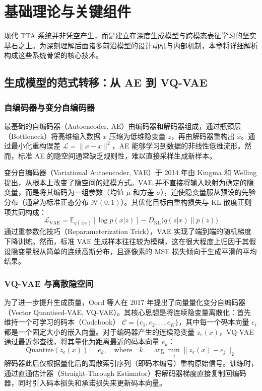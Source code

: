 \documentclass[12pt,a4paper]{article}
\begin{document}
\section{基础理论与关键组件}

现代 TTA 系统并非凭空产生，而是建立在深度生成模型与跨模态表征学习的坚实基石之上。为深刻理解后面诸多前沿模型的设计动机与内部机制，本章将详细解析构成这些系统骨架的核心技术。

\subsection{生成模型的范式转移：从 AE 到 VQ-VAE}

\subsubsection{自编码器与变分自编码器}
最基础的自编码器（Autoencoder, AE）由编码器和解码器组成，通过瓶颈层（Bottleneck）将高维输入数据 \(x\) 压缩为低维隐变量 \(z\)，再由解码器重构出 \(\hat{x}\)。通过最小化重构误差 \( \mathcal{L} = \| x - \hat{x} \|^2 \)，AE 能够学习到数据的非线性低维流形。然而，标准 AE 的隐空间通常缺乏规则性，难以直接采样生成新样本。

变分自编码器（Variational Autoencoder, VAE）于 2014 年由 Kingma 和 Welling 提出，从根本上改变了隐空间的建模方式。VAE 并不直接将输入映射为确定的隐变量，而是将其编码为一组参数（均值 \(\mu\) 和方差 \(\sigma\)），迫使隐变量服从预设的先验分布（通常为标准正态分布 \( \mathcal{N}(0,1) \)）。其优化目标由重构损失与 KL 散度正则项共同构成：
\begin{equation}
\mathcal{L}_{\text{VAE}} = \mathbb{E}_{q(z|x)}[\log p(x|z)] - D_{\text{KL}} \big( q(z|x) \| p(z) \big)
\end{equation}
通过重参数化技巧（Reparameterization Trick），VAE 实现了端到端的随机梯度下降训练。然而，标准 VAE 生成样本往往较为模糊，这在很大程度上归因于其假设隐变量服从简单的连续高斯分布，且逐像素的 MSE 损失倾向于生成平滑的平均结果。

\subsubsection{VQ-VAE 与离散隐空间}
为了进一步提升生成质量，Oord 等人在 2017 年提出了向量量化变分自编码器（Vector Quantised-VAE, VQ-VAE）。其核心思想是将连续隐变量离散化：首先维持一个可学习的码本（Codebook） \( \mathcal{C} = \{e_1, e_2, \dots, e_K\} \)，其中每一个码本向量 \(e_i\) 都是一个固定大小的嵌入向量。对于编码器产生的连续隐变量 \(z_e(x)\)，VQ-VAE 通过最近邻查找，将其量化为距离最近的码本向量 \(e_k\)：
\begin{equation}
\text{Quantize}(z_e(x)) = e_k, \quad \text{where} \quad k = \arg\min_j \| z_e(x) - e_j \|_2
\end{equation}
解码器此后仅根据量化后的离散索引序列（即码本编号）重构原始信号。训练时，通过直通估计器（Straight-Through Estimator）将解码器梯度直接复制回编码器，同时引入码本损失和承诺损失来更新码本向量。
\end{document}
